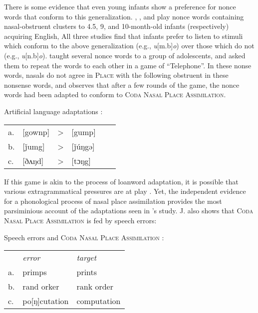 There is some evidence that even young infants show a preference for nonce words that conform to this generalization. \citet{Jusczyk2003}, \citet{Mattys1999}, and \citet{Jusczyk2002} play nonce words containing nasal-obstruent clusters to 4.5, 9, and 10-month-old infants (respectively) acquiring English, All three studies find that infants prefer to listen to stimuli which conform to the above generalization (e.g., \emph{u}[m.b]\emph{o}) over those which do not (e.g., \emph{u}[n.b]\emph{o}). \citet{Wright1975} taught several nonce words to a group of adolescents, and asked them to repeat the words to each other in a game of ``Telephone''. In these nonse words, nasals do not agree in \textsc{Place} with the following obstruent in these nonsense words, and \citeauthor{Wright1975} observes that after a few rounds of the game, the nonce words had been adapted to conform to \textsc{Coda Nasal Place Assimilation}.

\ex Artificial language adaptations \citep[][394, his transcriptions]{Wright1975}: \\
\begin{tabular}{l l l l l l}
a. & [gownp] & > & [gump] \\
b. & [ǰumg]  & > & [ǰúŋgə] \\
c. & [ðʌŋd]  & > & [tɔŋg] \\
\end{tabular} 
\xe

\noindent
If this game is akin to the process of loanword adaptation, it is possible that various extragrammatical pressures are at play \citep[e.g.,][]{Halle1998b,Dupoux1999,Ussishkin2003,Peperkamp2008}. Yet, the independent evidence for a phonological process of nasal place assimilation provides the most parsiminious account of the adaptations seen in \citeauthor{Wright1975}'s study. J. \citet{Myers1993} also shows that \textsc{Coda Nasal Place Assimilation} is fed by speech errors:

\ex Speech errors and \textsc{Coda Nasal Place Assimilation} \citep[][228]{Myers1993}: \\
\begin{tabular}{l l l}
   & \emph{error}  & \emph{target} \\
a. & primps        & prints        \\
b. & rand orker    & rank order    \\
c. & po[ŋ]cutation & computation   \\
\end{tabular}
\xe

